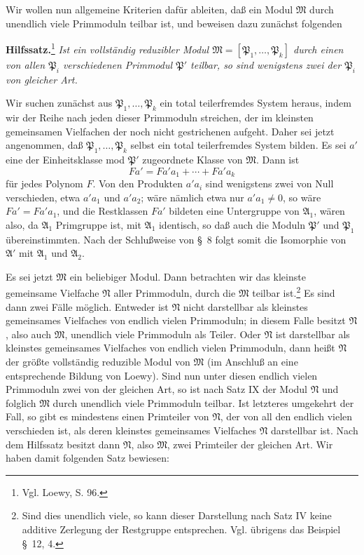 \documentclass[11pt]{article}
\begin{document}
Wir wollen nun allgemeine Kriterien dafür ableiten, daß ein Modul $\mathfrak M$ durch unendlich viele Primmoduln teilbar ist, und beweisen dazu zunächst folgenden

\textbf{Hilfssatz.}\footnote{Vgl. Loewy, S. 96.} \emph{Ist ein vollständig reduzibler Modul $\mathfrak M=[\mathfrak P_1,
\ldots,
\mathfrak P_k]$ durch einen von allen $\mathfrak P_i$ verschiedenen Primmodul $\mathfrak P'$ teilbar, so sind wenigstens zwei der $\mathfrak P_i$ von gleicher Art.}

Wir suchen zunächst aus $\mathfrak P_1,
\ldots,
\mathfrak P_k$ ein total teilerfremdes System heraus, indem wir der Reihe nach jeden dieser Primmoduln streichen, der im kleinsten gemeinsamen Vielfachen der noch nicht gestrichenen aufgeht. Daher sei jetzt angenommen, daß $\mathfrak P_1,
\ldots,
\mathfrak P_k$ selbst ein total teilerfremdes System bilden. Es sei $a'$ eine der Einheitsklasse mod $\mathfrak P'$ zugeordnete Klasse von $\mathfrak M$. Dann ist
\[
 Fa'=Fa'a_1+\cdots+Fa'a_k
\]
für jedes Polynom $F$. Von den Produkten $a'a_i$ sind wenigstens zwei von Null verschieden, etwa $a'a_1$ und $a'a_2$; wäre nämlich etwa nur $a'a_1\ne0$, so wäre $Fa'=Fa'a_1$, und die Restklassen $Fa'$ bildeten eine Untergruppe von $\mathfrak A_1$, wären also, da $\mathfrak A_1$ Primgruppe ist, mit $\mathfrak A_1$ identisch, so daß auch die Moduln $\mathfrak P'$ und $\mathfrak P_1$ übereinstimmten. Nach der Schlußweise von \S~8 folgt somit die Isomorphie von $\mathfrak A'$ mit $\mathfrak A_1$ und $\mathfrak A_2$.

Es sei jetzt $\mathfrak M$ ein beliebiger Modul. Dann betrachten wir das kleinste gemeinsame Vielfache $\mathfrak N$ aller Primmoduln, durch die $\mathfrak M$ teilbar ist.\footnote{Sind dies unendlich viele, so kann dieser Darstellung nach Satz IV keine additive Zerlegung der Restgruppe entsprechen. Vgl. übrigens das Beispiel \S~12, 4.} Es sind dann zwei Fälle möglich. Entweder ist $\mathfrak N$ nicht darstellbar als kleinstes gemeinsames Vielfaches von endlich vielen Primmoduln; in diesem Falle besitzt $\mathfrak N$, also auch $\mathfrak M$, unendlich viele Primmoduln als Teiler. Oder $\mathfrak N$ ist darstellbar als kleinstes gemeinsames Vielfaches von endlich vielen Primmoduln, dann heißt $\mathfrak N$ der größte vollständig reduzible Modul von $\mathfrak M$ (im Anschluß an eine entsprechende Bildung von Loewy). Sind nun unter diesen endlich vielen Primmoduln zwei von der gleichen Art, so ist nach Satz IX der Modul $\mathfrak N$ und folglich $\mathfrak M$ durch unendlich viele Primmoduln teilbar. Ist letzteres umgekehrt der Fall, so gibt es mindestens einen Primteiler von $\mathfrak N$, der von all den endlich vielen verschieden ist, als deren kleinstes gemeinsames Vielfaches $\mathfrak N$ darstellbar ist. Nach dem Hilfssatz besitzt dann $\mathfrak N$, also $\mathfrak M$, zwei Primteiler der gleichen Art. Wir haben damit folgenden Satz bewiesen:
\end{document}
